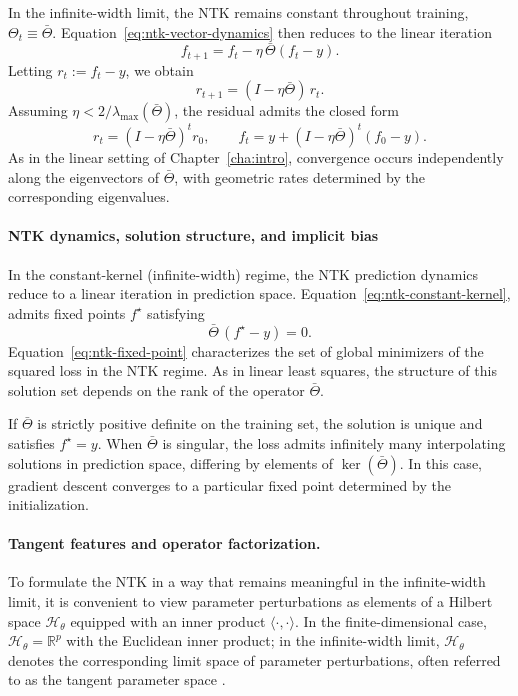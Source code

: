 In the infinite-width limit, the NTK remains constant throughout training,
$\Theta_t \equiv \bar\Theta$. Equation~\eqref{eq:ntk-vector-dynamics} then reduces
to the linear iteration
\begin{equation}
	f_{t+1} = f_t - \eta\,\bar\Theta (f_t - y).
	\label{eq:ntk-constant-kernel}
\end{equation}
Letting $r_t := f_t - y$, we obtain
\[
	r_{t+1} = (I - \eta \bar\Theta)\,r_t.
\]
Assuming $\eta < 2/\lambda_{\max}(\bar\Theta)$, the residual admits the closed
form
\begin{equation}
	r_t = (I - \eta \bar\Theta)^t r_0,
	\qquad
	f_t = y + (I - \eta \bar\Theta)^t (f_0 - y).
	\label{eq:ntk-solution}
\end{equation}
As in the linear setting of Chapter~\ref{cha:intro}, convergence occurs
independently along the eigenvectors of $\bar\Theta$, with geometric rates
determined by the corresponding eigenvalues.

\paragraph{NTK dynamics, solution structure, and implicit bias}

In the constant-kernel (infinite-width) regime, the NTK prediction dynamics
reduce to a linear iteration in prediction space. Equation~\eqref{eq:ntk-constant-kernel},
admits fixed points $f^\star$ satisfying
\begin{equation}
	\bar\Theta\,(f^\star - y) = 0.
	\label{eq:ntk-fixed-point}
\end{equation}
Equation~\eqref{eq:ntk-fixed-point} characterizes the set of global minimizers of
the squared loss in the NTK regime. As in linear least squares, the structure of
this solution set depends on the rank of the operator $\bar\Theta$.

If $\bar\Theta$ is strictly positive definite on the training set, the solution
is unique and satisfies $f^\star = y$. When $\bar\Theta$ is singular, the loss
admits infinitely many interpolating solutions in prediction space, differing
by elements of $\ker(\bar\Theta)$. In this case, gradient descent converges to a
particular fixed point determined by the initialization.

\paragraph{Tangent features and operator factorization.}
To formulate the NTK in a way that remains meaningful in the infinite-width
limit, it is convenient to view parameter perturbations as elements of a
Hilbert space $\mathcal{H}_\theta$ equipped with an inner product
$\langle\cdot,\cdot\rangle$. In the finite-dimensional case,
$\mathcal{H}_\theta=\mathbb{R}^p$ with the Euclidean inner product; in the
infinite-width limit, $\mathcal{H}_\theta$ denotes the corresponding limit
space of parameter perturbations, often referred to as the tangent parameter
space \citep{jacot2018ntk, lee2020wide}.


